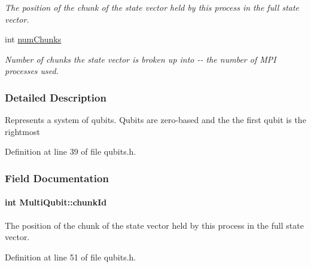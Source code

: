 \begin{DoxyCompactItemize}
\begin{DoxyCompactList}\small\item\em The position of the chunk of the state vector held by this process in the full state vector. \item\end{DoxyCompactList}\item 
int \hyperlink{structMultiQubit_acd43f2f57991709c9e94f73662c972b2}{numChunks}
\begin{DoxyCompactList}\small\item\em Number of chunks the state vector is broken up into -\/-\/ the number of MPI processes used. \item\end{DoxyCompactList}\end{DoxyCompactItemize}


\subsubsection{Detailed Description}
Represents a system of qubits. Qubits are zero-\/based and the the first qubit is the rightmost 

Definition at line 39 of file qubits.h.

\subsubsection{Field Documentation}
\hypertarget{structMultiQubit_ab10c88249fa3825d6227ceec01d37e37}{
\paragraph[{chunkId}]{\setlength{\rightskip}{0pt plus 5cm}int {\bf MultiQubit::chunkId}}\hfill}
\label{structMultiQubit_ab10c88249fa3825d6227ceec01d37e37}


The position of the chunk of the state vector held by this process in the full state vector. 

Definition at line 51 of file qubits.h.

